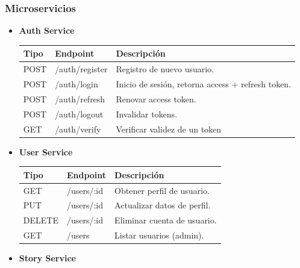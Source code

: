 \documentclass[a4paper,11 pt]{article}
\begin{document}
\subsubsection{Microservicios}
\begin{itemize}
    \item \textbf{Auth Service}
    \begin{table}[H]
        \footnotesize{
        \centering
        \begin{tabular}{|M{0.1\textwidth}|M{0.2\textwidth}|M{0.5\textwidth}|}
            \hline
            \textbf{Tipo} &\textbf{Endpoint} & \textbf{Descripción} \\
            \hline
             POST & /auth/register & Registro de nuevo usuario.  \\
             \hline
             POST & /auth/login & Inicio de sesión, retorna access + refresh token. \\
             \hline
             POST & /auth/refresh & Renovar access token. \\
             \hline
             POST & /auth/logout & Invalidar tokens.\\
             \hline
             GET & /auth/verify & Verificar validez de un token\\
             \hline
        \end{tabular}
        \label{t11}
        }
    \end{table}
    \item \textbf{User Service}
    \begin{table}[H]
        \footnotesize{
        \centering
        \begin{tabular}{|M{0.1\textwidth}|M{0.2\textwidth}|M{0.5\textwidth}|}
            \hline
            \textbf{Tipo} &\textbf{Endpoint} & \textbf{Descripción} \\
            \hline
             GET & /users/:id & Obtener perfil de usuario.  \\
             \hline
             PUT & /users/:id & Actualizar datos de perfil. \\
             \hline
             DELETE & /users/:id & Eliminar cuenta de usuario. \\
             \hline
             GET & /users & Listar usuarios (admin).\\
             \hline
        \end{tabular}
        \label{t12}
        }
    \end{table}
    \item \textbf{Story Service}

\end{itemize}
\end{document}
